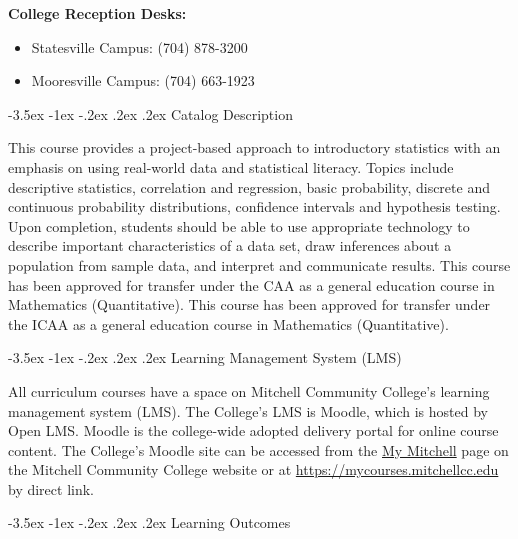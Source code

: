 \documentclass[11pt]{article}
\makeatletter
\renewcommand\section{\@startsection{section}{1}{0pt}%
  {-3.5ex \@plus -1ex \@minus -.2ex}%
  {.2ex \@plus.2ex}%
  {\normalfont\Large\bfseries}} %
\makeatother
\begin{document}
\textbf{College Reception Desks:}

\begin{itemize}
\item Statesville Campus: (704) 878-3200
\item Mooresville Campus: (704) 663-1923
\end{itemize}

\section{Catalog Description}

This course provides a project-based approach to introductory statistics with an emphasis on using real-world data and statistical literacy. Topics include descriptive statistics, correlation and regression, basic probability, discrete and continuous probability distributions, confidence intervals and hypothesis testing. Upon completion, students should be able to use appropriate technology to describe important characteristics of a data set, draw inferences about a population from sample data, and interpret and communicate results. This course has been approved for transfer under the CAA as a general education course in Mathematics (Quantitative). This course has been approved for transfer under the ICAA as a general education course in Mathematics (Quantitative).

\section{Learning Management System (LMS)}

All curriculum courses have a space on Mitchell Community College's learning management system (LMS). The College's LMS is Moodle, which is hosted by Open LMS. Moodle is the college-wide adopted delivery portal for online course content. The College's Moodle site can be accessed from the \href{https://mitchellcc.edu/my-mitchell}{My Mitchell} page on the Mitchell Community College website or at \href{https://mycourses.mitchellcc.edu}{https://mycourses.mitchellcc.edu} by direct link.

\section{Learning Outcomes}
\end{document}
